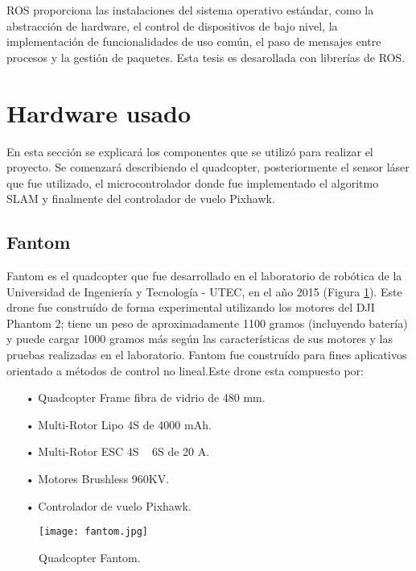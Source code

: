 ROS proporciona las instalaciones del sistema operativo estándar, como la abstracción de hardware, el control de dispositivos de bajo nivel, la implementación de funcionalidades de uso común, el paso de mensajes entre procesos y la gestión de paquetes. Esta tesis es desarollada con librerías de ROS.

\section{Hardware usado}
En esta sección se explicará los componentes que se utilizó para realizar el proyecto. Se comenzará describiendo el quadcopter, posteriormente el sensor láser que fue utilizado, el microcontrolador donde fue implementado el algoritmo SLAM y finalmente del controlador de vuelo Pixhawk.

\subsection{Fantom}
Fantom es el quadcopter que fue desarrollado en el laboratorio de robótica de la Universidad de Ingeniería y Tecnología - UTEC, en el año 2015 (Figura \ref{f:fantom}). Este drone fue construído de forma experimental utilizando los motores del DJI Phantom 2; tiene un peso de aproximadamente 1100 gramos (incluyendo batería) y puede cargar 1000 gramos más según las características de sus motores y las pruebas realizadas en el laboratorio. Fantom fue construído para fines aplicativos orientado a métodos de control no lineal.Este drone esta compuesto por:

\begin{itemize}
\item[•] Quadcopter Frame fibra de vidrio de 480 mm.
\item[•] Multi-Rotor Lipo 4S de 4000 mAh.
\item[•] Multi-Rotor ESC 4S ~ 6S de 20 A.
\item[•] Motores Brushless 960KV.
\item[•] Controlador de vuelo Pixhawk.
\end{itemize}
\begin{figure}
\centering
\texttt{[image: fantom.jpg]}
\caption{Quadcopter Fantom.}
\label{f:fantom}
\end{figure}

